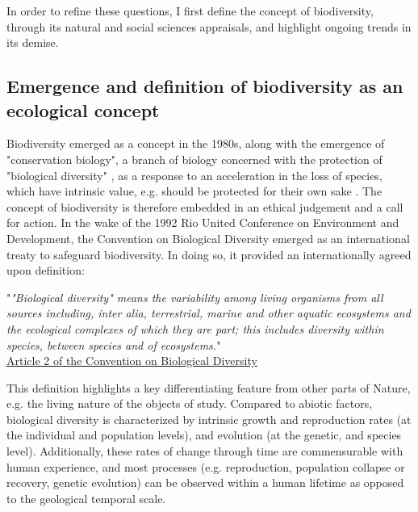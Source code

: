 In order to refine these questions, I first define the concept of biodiversity, through its natural and social sciences appraisals, and highlight ongoing trends in its demise.


\subsection*{Emergence and definition of biodiversity as an ecological concept}

Biodiversity emerged as a concept in the 1980s, along with the emergence of "conservation biology", a branch of biology concerned with the protection of "biological diversity" \citep{soule_what_1985}, as a response to an acceleration in the loss of species, which have intrinsic value, e.g. should be protected for their own sake \citep{soule_conservation_1986}. 
The concept of biodiversity is therefore embedded in an ethical judgement and a call for action. In the wake of the 1992 Rio United Conference on Environment and Development, the Convention on Biological Diversity emerged as an international treaty to safeguard biodiversity. In doing so, it provided an internationally agreed upon definition:

\begin{displayquote}
"\textit{"Biological diversity" means the variability among living organisms from all sources including, inter alia, terrestrial, marine and other aquatic ecosystems and the ecological complexes of which they are part; this includes diversity within species, between species and of ecosystems.}"\\
\hspace*{\fill} \small{\href{https://www.cbd.int/convention/articles/default.shtml?a=cbd-02}{Article 2 of the Convention on Biological Diversity}}
\end{displayquote}

This definition highlights a key differentiating feature from other parts of Nature, e.g. the living nature of the objects of study. Compared to abiotic factors, biological diversity is characterized by intrinsic growth and reproduction rates (at the individual and population levels), and evolution (at the genetic, and species level). Additionally, these rates of change through time are commensurable with human experience, and most processes (e.g. reproduction, population collapse or recovery, genetic evolution) can be observed within a human lifetime as opposed to the geological temporal scale. 

